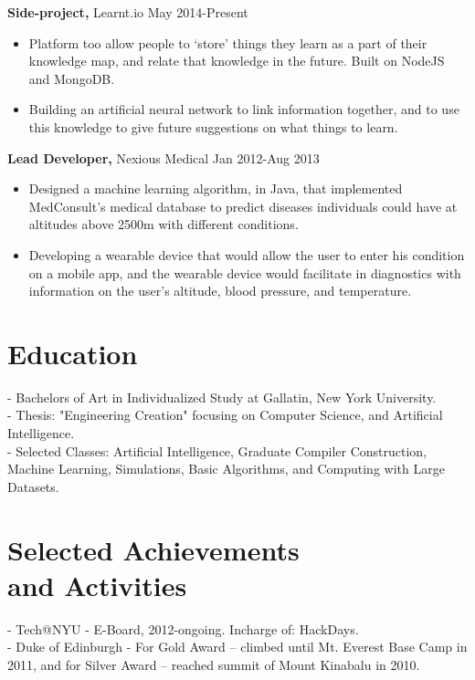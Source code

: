 \documentclass[margin]{res}
\begin{document}
\begin{resume}
 {\bf Side-project,} Learnt.io \hfill May 2014-Present
\begin{itemize} \itemsep -2pt 
\item Platform too allow people to `store' things they learn as a part of their knowledge map, and relate that knowledge in the future. Built on NodeJS and MongoDB.
\item Building an artificial neural network to link information together, and to use this knowledge to give future suggestions on what things to learn.
\end{itemize}
 
 {\bf Lead Developer,} Nexious Medical \hfill Jan 2012-Aug 2013
 \begin{itemize} \itemsep -2pt
 \item Designed a machine learning algorithm, in Java, that implemented MedConsult's medical database to predict diseases individuals could have at altitudes above 2500m with different conditions.
 \item Developing a wearable device that would allow the user to enter his condition on a mobile app, and the wearable device would facilitate in diagnostics with information on the user's altitude, blood pressure, and temperature.
 \end{itemize}

\section{Education} 
- Bachelors of Art in Individualized Study at Gallatin, New York University. \\
- Thesis: "Engineering Creation" focusing on Computer Science, and Artificial Intelligence. \\
- Selected Classes: Artificial Intelligence, Graduate Compiler Construction, Machine Learning, Simulations, Basic Algorithms, and Computing with Large Datasets.

\section{Selected Achievements \\ and Activities} 
- Tech@NYU - E-Board, 2012-ongoing. Incharge of: HackDays. \\
- Duke of Edinburgh - For Gold Award -- climbed until Mt. Everest Base Camp in 2011, and for Silver Award -- reached summit of Mount Kinabalu in 2010. \\

\end{resume} 
\end{document}
